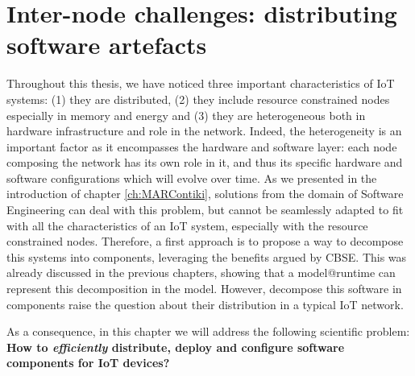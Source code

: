 \chapter{Inter-node challenges: distributing software artefacts}
\label{ch:softArtDist}
Throughout this thesis, we have noticed three important characteristics of IoT systems: (1) they are distributed, (2) they include resource constrained nodes especially in memory and energy and (3) they are heterogeneous both in hardware infrastructure and role in the network. 
Indeed, the heterogeneity is an important factor as it encompasses the hardware and software layer: each node composing the network has its own role in it, and thus its specific hardware and software configurations which will evolve over time.
As we presented in the introduction of chapter \ref{ch:MARContiki}, solutions from the domain of Software Engineering can deal with this problem, but cannot be seamlessly adapted to fit with all the characteristics of an IoT system, especially with the resource constrained nodes.
Therefore, a first approach is to propose a way to decompose this systems into components, leveraging the benefits argued by CBSE. This was already discussed in the previous chapters, showing that a model@runtime can represent this decomposition in the model.
However, decompose this software in components raise the question about their distribution in a typical IoT network.

As a consequence, in this chapter we will address the following scientific problem: \textbf{How to \textit{efficiently} distribute, deploy and configure software components for IoT devices?}

